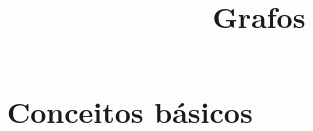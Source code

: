 
\title{Grafos}

\def\GG{
	\begin{tikzpicture}[vertex/.style={circle,draw}]
	\node[vertex] (v0) at (0,0) {$0$};
	\node[vertex] (v1) at (-1,-1) {$1$};
	\node[vertex] (v2) at (1,-1) {$2$};
	\node[vertex] (v3) at (1.5,-2) {$3$};

	\graph {
       	       (v0) -- (v1) -- (v2) -- (v0);
	       (v2) -- (v3);
	 };

	 \node [above of=v0]{Grafo não direcionado};
	 \end{tikzpicture}
}

\def\GD {
	\begin{tikzpicture}[vertex/.style={circle,draw}]
	\node[vertex] (v0) at (0,0) {$0$};
	\node[vertex] (v1) at (-1,-1) {$1$};
	\node[vertex] (v2) at (1,-1) {$2$};
	\node[vertex] (v3) at (1.5,-2) {$3$};
	\path (v0) edge [loop above](v0); %

	\graph {
       	       (v0) -> (v1) -> (v2) -> (v0);
       	       (v2) -> (v3);
        };

	\node [above of=v0]{Dígrafo};
	\end{tikzpicture}
}

\frame{\maketitle}

\section{Conceitos básicos}

